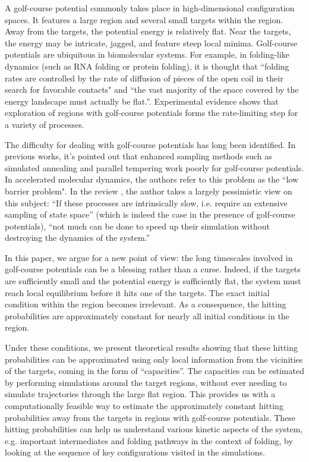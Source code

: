 \documentclass[english, aip, jcp, priprint, graphicx,floatfix]{revtex4-1}
\theoremstyle{plain}
\theoremstyle{definition}
\theoremstyle{plain}
\begin{document}
A golf-course potential commonly takes place in high-dimensional configuration spaces.  It features a large region and several small targets within the region.  Away from the targets, the potential energy is relatively flat.  Near the targets, the energy may be intricate, jagged, and feature steep local minima.  Golf-course potentials are ubiquitous in biomolecular systems. For example, in folding-like dynamics (such as RNA folding or protein folding), it is thought that ``folding rates are controlled by the rate of diffusion of pieces of the open coil in their search for favorable contacts" and ``the vast majority of the space covered by the energy landscape must actually be flat.''\cite{McLeish2005-dq}. Experimental evidence shows that exploration of regions with golf-course potentials forms the rate-limiting step for a variety of processes.\cite{Teschner1987-qs, Jacob1999-bs, Goldberg1999-mv, Plaxco1998-iv}  

The difficulty for dealing with golf-course potentials has long been identified. In previous works\cite{Baum1986-we, Wille1987-tf, Machta2009-gh}, it's pointed out that enhanced sampling methods such as simulated annealing and parallel tempering work poorly for golf-course potentials. In accelerated molecular dynamics\cite{Sorensen2000-qm}, the authors refer to this problem as the ``low barrier problem". In the review \cite{Christen2008-ge}, the author takes a largely pessimistic view on this subject: ``If these processes are intrinsically slow, i.e. require an extensive sampling of state space'' (which is indeed the case in the presence of golf-course potentials), ``not much can be done to speed up their simulation without destroying the dynamics of the system.''

In this paper, we argue for a new point of view: the long timescales involved in golf-course potentials can be a blessing rather than a curse.  Indeed, if the targets are sufficiently small and the potential energy is sufficiently flat, the system must reach local equilibrium before it hits one of the targets. The exact initial condition within the region becomes irrelevant. As a consequence, the hitting probabilities are approximately constant for nearly all initial conditions in the region. 

Under these conditions, we present theoretical results showing that these hitting probabilities can be approximated using only local information from the vicinities of the targets, coming in the form of ``capacities''.  The capacities can be estimated by performing simulations around the target regions, without ever needing to simulate trajectories through the large flat region. This provides us with a computationally feasible way to estimate the approximately constant hitting probabilities away from the targets in regions with golf-course potentials. These hitting probabilities can help us understand various kinetic aspects of the system, e.g. important intermediates and folding pathways in the context of folding, by looking at the sequence of key configurations visited in the simulations.
\end{document}
